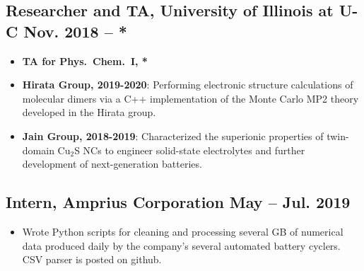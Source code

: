 \documentclass{article}
\begin{document}
\subsection{Researcher and TA, University of Illinois at U-C
            \hfill Nov. 2018 -- *}
\begin{itemize}[noitemsep,nolistsep]
	\item \textbf{TA for Phys.\ Chem.\ I, *}

	\item \textbf{Hirata Group, 2019-2020}: Performing electronic structure
	calculations of molecular dimers via a C++ implementation of the Monte
	Carlo MP2 theory developed in the Hirata group.

	\item \textbf{Jain Group, 2018-2019}: Characterized the superionic
	properties of twin-domain Cu$_2$S NCs to engineer solid-state
	electrolytes and further development of next-generation batteries.
\end{itemize}
\subsection{Intern, Amprius Corporation \hfill May -- Jul. 2019}
\begin{itemize}[noitemsep,nolistsep]
	\item Wrote Python scripts for cleaning and processing several GB of
	numerical data produced daily by the company's several automated battery
	cyclers. CSV parser is posted on github.
\end{itemize}
\end{document}

